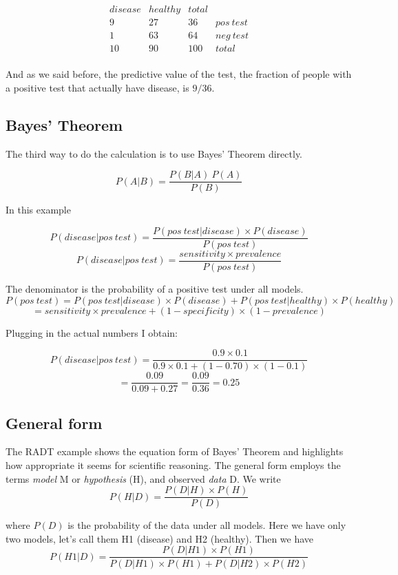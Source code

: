 \documentclass[11pt, oneside]{article}
\begin{document}
\[
\begin{matrix}
disease & healthy & total\\
9 & 27 & 36 & pos\ test \\
1 & 63 & 64 & neg\ test \\
\hline
10 & 90 & 100 & total \\
\end{matrix}
\]

And as we said before, the predictive value of the test, the fraction of people with a positive test that actually have disease, is $9/36$.

\subsection*{Bayes' Theorem}

The third way to do the calculation is to use Bayes' Theorem directly.

\[ P(A|B) = \frac{P(B|A) \ P(A)}{P(B)} \]

In this example

\[ P(disease|pos\ test) = \frac{P(pos\ test|disease) \times P(disease)}{P(pos \ test)} \]
\[ P(disease|pos\ test) = \frac{sensitivity \times prevalence}{P(pos \ test)} \]

The denominator is the probability of a positive test under all models.
\[ P(pos \ test) = P(pos \ test|disease) \times P(disease) + P(pos \ test|healthy) \times P(healthy) \]
\[ = sensitivity \times prevalence + (1-specificity) \times (1-prevalence) \]

Plugging in the actual numbers I obtain:

\[ P(disease|pos\ test) = \frac{0.9 \times 0.1}{0.9 \times 0.1 + (1-0.70) \times (1-0.1)} \]
\[ = \frac{0.09}{0.09 + 0.27} = \frac{0.09}{0.36} = 0.25 \]

\subsection*{General form}
The RADT example shows the equation form of Bayes' Theorem and highlights how appropriate it seems for scientific reasoning.  The general form employs the terms \emph{model}  M or \emph{hypothesis} (H), and observed \emph{data} D.  We write
\[ P(H|D) = \frac{P(D|H) \times P(H)}{P(D)} \]

where $P(D)$ is the probability of the data under all models.  Here we have only two models, let's call them H1 (disease) and H2 (healthy).  Then we have
\[ P(H1|D) = \frac{P(D|H1) \times P(H1)}{P(D|H1) \times P(H1) + P(D|H2) \times P(H2) } \]
\end{document}
